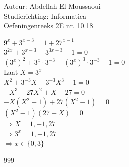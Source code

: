 \documentclass[a4paper]{article}
\begin{document}
  
\noindent \large Auteur: Abdellah El Moussaoui \\
\noindent \large Studierichting: Informatica\\
\noindent \large Oefeningenreeks 2E nr. 10.18\\

\medskip

\normalsize


$9^x+3^{x-3}=1+27^{x-1}$\\

$3^{2x}+3^{x-3}-3^{3x-3}-1=0$\\

$\left(3^x\right)^2+3^x\cdot3^{-3}-\left(3^x\right)^3\cdot3^{-3}-1=0$\\

Laat $X=3^x$\\

$X^2+3^{-3}X-3^{-3}X^3-1=0$\\

$-X^3+27X^2+X-27=0$\\

$-X\left(X^2-1\right)+27\left(X^2-1\right)=0$\\

$\left(X^2-1\right)\left(27-X\right)=0$\\

$\Rightarrow X=1,-1,27$\\

$\Rightarrow 3^x=1,-1,27$\\

$\Rightarrow \boxed{x\in\{0, 3\}}$\\




\begin{thebibliography}{999}
\end{thebibliography}
\end{document}
